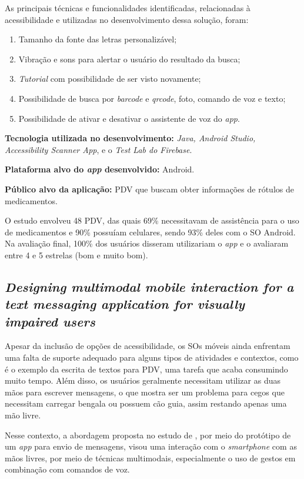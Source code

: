 As principais técnicas e funcionalidades identificadas, relacionadas à acessibilidade e utilizadas no desenvolvimento dessa solução, foram:

\begin{enumerate}
    \item Tamanho da fonte das letras personalizável;
    \item Vibração e sons para alertar o usuário do resultado da busca;
    \item \emph{Tutorial} com possibilidade de ser visto novamente;
    \item Possibilidade de busca por \emph{barcode} e \emph{qrcode}, foto, comando de voz e texto;
    \item Possibilidade de ativar e desativar o assistente de voz do \emph{app}.
\end{enumerate}

\textbf{Tecnologia utilizada no desenvolvimento:} \emph{Java, Android Studio, Accessibility Scanner App}, e o \emph{Test Lab do Firebase}.

\textbf{Plataforma alvo do \emph{app} desenvolvido:} Android.

\textbf{Público alvo da aplicação:} PDV que buscam obter informações de rótulos de medicamentos\@.

O estudo envolveu 48 PDV, das quais 69\% necessitavam de assistência para o uso de medicamentos e 90\% possuíam celulares, sendo 93\%  deles com o SO Android.
Na avaliação final, 100\% dos usuários disseram utilizariam o \emph{app} e o avaliaram entre 4 e 5 estrelas (bom e muito bom).


\subsection{\emph{Designing multimodal mobile interaction for a text messaging application for visually impaired users}}

Apesar da inclusão de opções de acessibilidade, os SOs móveis ainda enfrentam uma falta de suporte adequado para alguns tipos de atividades e contextos, como é o exemplo da escrita de textos para PDV, uma tarefa que acaba consumindo muito tempo.
Além disso, os usuários geralmente necessitam utilizar as duas mãos para escrever mensagens, o que mostra ser um problema para cegos que necessitam carregar bengala ou possuem cão guia, assim restando apenas uma mão livre.

Nesse contexto, a abordagem proposta no estudo de , por meio do protótipo de um \emph{app} para envio de mensagens, visou uma interação com o \emph{smartphone}
com as mãos livres, por meio de técnicas multimodais, especialmente o uso de gestos em combinação com comandos de voz.

